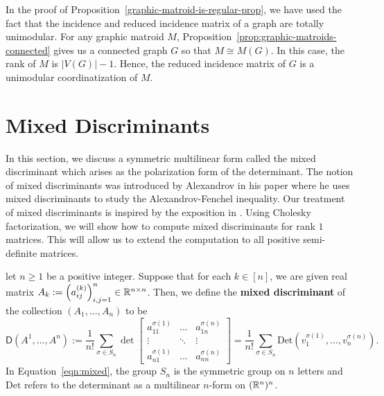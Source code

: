 \documentclass{puthesis-UG}
\begin{document}
In the proof of Proposition~\ref{graphic-matroid-is-regular-prop}, we have used the fact that the incidence and reduced incidence matrix of a graph are totally unimodular. For any graphic matroid $M$, Proposition~\ref{prop:graphic-matroids-connected} gives us a connected graph $G$ so that $M \cong M(G)$. In this case, the rank of $M$ is $|V(G)| - 1$. Hence, the reduced incidence matrix of $G$ is a unimodular coordinatization of $M$.  

\section{Mixed Discriminants} \label{sec:mixed-discriminants}

In this section, we discuss a symmetric multilinear form called the mixed discriminant which arises as the polarization form of the determinant. The notion of mixed discriminants was introduced by Alexandrov in his paper \cite{aleksandrov} where he uses mixed discriminants to study the Alexandrov-Fenchel inequality. Our treatment of mixed discriminants is inspired by the exposition in \cite{bapat_raghavan_1997}. Using Cholesky factorization, we will show how to compute mixed discriminants for rank $1$ matrices. This will allow us to extend the computation to all positive semi-definite matrices. 

\begin{defn} \label{defn-mixed-discriminant}
	let $n \geq 1$ be a positive integer. Suppose that for each $k \in [n]$, we are given real matrix $A_k := \left (a_{ij}^{(k)} \right )_{i, j = 1}^n \in \mathbb{R}^{n \times n}$. Then, we define the \textbf{mixed discriminant} of the collection $(A_1, \ldots, A_n)$ to be 
	\begin{equation} \label{eqn:mixed}
		\mathsf{D}(A^1, \ldots, A^n) := \frac{1}{n!} \sum_{\sigma \in S_n} 
		\det 
		\begin{bmatrix} 
			a_{11}^{\sigma(1)} & \ldots & a_{1n}^{\sigma(n)} \\
			\vdots & \ddots & \vdots \\
			a_{n1}^{\sigma(1)} & \ldots & a_{nn}^{\sigma(n)}
		\end{bmatrix} = \frac{1}{n!} \sum_{\sigma \in S_n} \text{Det} \left (v^{\sigma(1)}_{1}, \ldots, v_{n}^{\sigma(n)} \right ).
	\end{equation}
	In Equation~\ref{eqn:mixed}, the group $S_n$ is the symmetric group on $n$ letters and $\text{Det}$ refers to the determinant as a multilinear $n$-form on $(\mathbb{R}^n)^n$. 
\end{defn}
\end{document}
